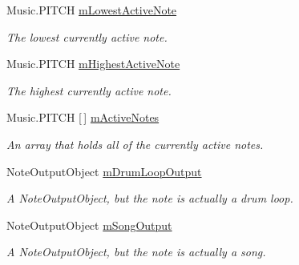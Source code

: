 \begin{Indent}
\begin{DoxyCompactItemize}
Music.\+P\+I\+T\+CH \hyperlink{group___virtual_instrument_manager_a5e3a5116e0dabb37e0ea21d73ac1567e}{m\+Lowest\+Active\+Note}
\begin{DoxyCompactList}\small\item\em The lowest currently active note. \end{DoxyCompactList}\item 
\mbox{\label{group___virtual_instrument_manager_a73a09a4e4f09c0e5b3871dc9ad6c757e}} 
Music.\+P\+I\+T\+CH \hyperlink{group___virtual_instrument_manager_a73a09a4e4f09c0e5b3871dc9ad6c757e}{m\+Highest\+Active\+Note}
\begin{DoxyCompactList}\small\item\em The highest currently active note. \end{DoxyCompactList}\item 
\mbox{\label{group___virtual_instrument_manager_a5cedf9995d59b416412677e6004b659c}} 
Music.\+P\+I\+T\+CH \mbox{[}$\,$\mbox{]} \hyperlink{group___virtual_instrument_manager_a5cedf9995d59b416412677e6004b659c}{m\+Active\+Notes}
\begin{DoxyCompactList}\small\item\em An array that holds all of the currently active notes. \end{DoxyCompactList}\item 
\mbox{\label{group___virtual_instrument_manager_a5f71cb71d240042312dcc13b481b068d}} 
Note\+Output\+Object \hyperlink{group___virtual_instrument_manager_a5f71cb71d240042312dcc13b481b068d}{m\+Drum\+Loop\+Output}
\begin{DoxyCompactList}\small\item\em A Note\+Output\+Object, but the note is actually a drum loop. \end{DoxyCompactList}\item 
\mbox{\label{group___virtual_instrument_manager_aa8d4f5642f5ac4dca4f4178b0052c78d}} 
Note\+Output\+Object \hyperlink{group___virtual_instrument_manager_aa8d4f5642f5ac4dca4f4178b0052c78d}{m\+Song\+Output}
\begin{DoxyCompactList}\small\item\em A Note\+Output\+Object, but the note is actually a song. \end{DoxyCompactList}\item 

\end{DoxyCompactItemize}
\end{Indent}
